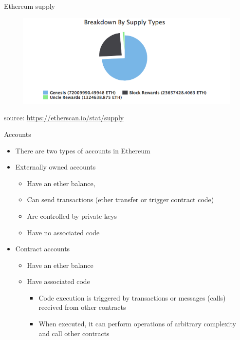 \documentclass[10pt]{beamer}
\begin{document}

\begin{frame}{Ethereum supply}
	\begin{figure}[]
		\centering
		\includegraphics  [scale=0.5]{Images/eth-breakdown}
	\end{figure}
	\begin{scriptsize}
		source: \href{https://etherscan.io/stat/supply}{https://etherscan.io/stat/supply}
	\end{scriptsize}
\end{frame}


\begin{frame}{Accounts}
	\begin{itemize}
		\item There are two types of accounts in Ethereum
		\item Externally owned accounts
		\begin{small}
			\begin{itemize}
				\item Have an ether balance,
				\item Can send transactions (ether transfer or trigger contract code)
				\item Are controlled by private keys
				\item Have no associated code
			\end{itemize}
		\end{small}
		\item Contract accounts
		\begin{small}
			\begin{itemize}
				\item Have an ether balance
				\item Have associated code
				\begin{itemize}
					\item Code execution is triggered by transactions or messages (calls) received from other contracts
					\item When executed, it can perform operations of arbitrary complexity and call other contracts
				\end{itemize}
			\end{itemize}
		\end{small}
	\end{itemize}
\end{frame}
\end{document}
